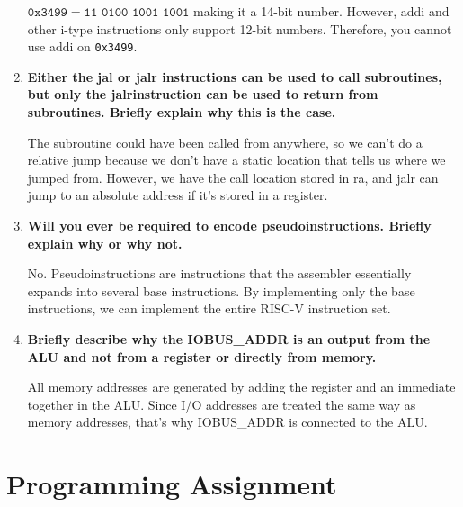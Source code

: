 \documentclass{article}
\begin{document}
\begin{enumerate}
        $\mathtt{0x3499}  = \texttt{11 0100 1001 1001}$ making it a 14-bit number. However, addi and other 
        i-type instructions only support 12-bit numbers. Therefore, you cannot use addi on \texttt{0x3499}.
    \item \textbf{Either the jal or jalr instructions can be used to call subroutines, but only the jalrinstruction can be used to return from subroutines. Briefly explain why this is the case.}
    
        The subroutine could have been called from anywhere, so we can't do a relative jump because we don't
        have a static location that tells us where we jumped from. However, we have the call location stored in 
        ra, and jalr can jump to an absolute address if it's stored in a register. 
    \item \textbf{Will you ever be required to encode pseudoinstructions. Briefly explain why or why not.}
    
        No. Pseudoinstructions are instructions that the assembler essentially expands into several base 
        instructions. By implementing only the base instructions, we can implement the entire RISC-V 
        instruction set.
    \item \textbf{Briefly describe why the IOBUS\_ADDR is an output from the ALU and not from a register or directly from memory. }
    
        All memory addresses are generated by adding the register and an immediate together in the ALU. 
        Since I/O addresses are treated the same way as memory addresses, that's why IOBUS\_ADDR is 
        connected to the ALU. 
\end{enumerate}

\pagebreak

\section{Programming Assignment}
\end{document}
